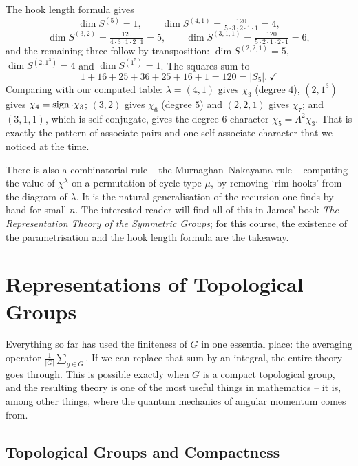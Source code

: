 \documentclass[a4paper]{scrartcl}
\begin{document}
\begin{example}
	The hook length formula gives
	$$\dim S^{(5)} = 1,\qquad \dim S^{(4,1)} = \tfrac{120}{5\cdot3\cdot2\cdot1\cdot1} = 4,$$
	$$\dim S^{(3,2)} = \tfrac{120}{4\cdot3\cdot1\cdot2\cdot1} = 5,\qquad \dim S^{(3,1,1)} = \tfrac{120}{5\cdot2\cdot1\cdot2\cdot1} = 6,$$
	and the remaining three follow by transposition: $\dim S^{(2,2,1)} = 5$, $\dim S^{(2,1^3)} = 4$ and $\dim S^{(1^5)} = 1$. The squares sum to
	$$1 + 16+25+36+25+16+1 = 120 = |S_5|.\ \checkmark$$
	Comparing with our computed table: $\lambda = (4,1)$ gives $\chi_3$ (degree $4$), $(2,1^3)$ gives $\chi_4 = \operatorname{sign}\cdot\chi_3$; $(3,2)$ gives $\chi_6$ (degree $5$) and $(2,2,1)$ gives $\chi_7$; and $(3,1,1)$, which is self-conjugate, gives the degree-$6$ character $\chi_5 = \Lambda^2\chi_3$. That is exactly the pattern of associate pairs and one self-associate character that we noticed at the time.
\end{example}

\begin{remark}
	There is also a combinatorial rule -- the Murnaghan--Nakayama rule -- computing the value of $\chi^\lambda$ on a permutation of cycle type $\mu$, by removing `rim hooks' from the diagram of $\lambda$. It is the natural generalisation of the recursion one finds by hand for small $n$. The interested reader will find all of this in James' book \emph{The Representation Theory of the Symmetric Groups}; for this course, the existence of the parametrisation and the hook length formula are the takeaway.
\end{remark}

\section{Representations of Topological Groups}

Everything so far has used the finiteness of $G$ in one essential place: the averaging operator $\frac1{|G|}\sum_{g\in G}$. If we can replace that sum by an integral, the entire theory goes through. This is possible exactly when $G$ is a compact topological group, and the resulting theory is one of the most useful things in mathematics -- it is, among other things, where the quantum mechanics of angular momentum comes from.

\subsection{Topological Groups and Compactness}
\end{document}
